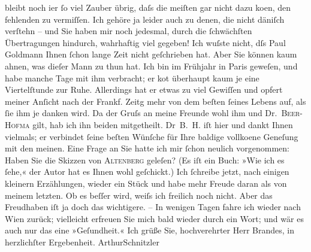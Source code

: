 \begin{ledgroupsized}[t]{13cm}
               bleibt noch i{\geminationm}er ſo viel Zauber übrig, daſs die meiſten
               gar nicht dazu ko{\geminationm}en, den fehlenden zu vermiſſen. Ich
               gehöre ja leider auch zu denen, die nicht däniſch verſtehn – und Sie haben mir noch jedesmal, durch die ſchwächſten
               Übertragungen hindurch, wahrhaftig {\pb}viel
               gegeben!\pend
           \pstart
           Ich wuſste nicht, dſs Paul Goldmann Ihnen
               ſchon lange Zeit nicht geſchrieben hat. Aber Sie können kaum ahnen, was dieſer Mann
               zu thun hat. Ich bin im Frühjahr in Paris
               geweſen, und habe manche Tage mit ihm verbracht; er ko{\geminationm}t
               überhaupt kaum je eine Viertelſtunde zur Ruhe. Allerdings hat er etwas zu viel
               Gewiſſen und opfert meiner An{\pb}ſicht nach der Frankf. Zeitg mehr von dem beſten ſeines Lebens
               auf, als ſie ihm je danken wird. Da der Gruſs an meine Freunde wohl ihm und Dr. \textsc{Beer-Hofma{\geminationn}} gilt, hab ich ihn beiden mitgetheilt. Dr \textsc{B. H.} iſt hier und dankt Ihnen vielmals; er verbindet ſeine beſten Wünſche für Ihre
               baldige vollko{\geminationm}ene Geneſung mit den meinen.\pend
           \pstart
           {\pb}Eine Frage an Sie hatte ich mir ſchon neulich
               vorgenommen: Haben Sie die Skizzen von \textsc{Altenberg} geleſen? (Es iſt ein Buch: »Wie ich es
                  ſehe,« der Autor hat es Ihnen wohl geſchickt.)\pend
           \pstart
           Ich ſchreibe jetzt, nach einigen kleinern Erzählungen, wieder ein Stück und habe mehr
               Freude daran als von meinem letzten. Ob es beſſer wird,  weiſs ich freilich {\pb}noch nicht. Aber
               das Freudhaben iſt ja doch das wichtigere. –\pend
           \pstart
           In wenigen Tagen fahre ich wieder nach Wien
               zurück; vielleicht erfreuen Sie mich bald wieder durch ein Wort; und wär es auch nur
               das eine »Geſundheit.«\pend
           \pstart Ich grüße Sie, hochverehrter Herr Brandes, in herzlichſter Ergebenheit.
                  \spacefill\mbox{ArthurSchnitzler}\pend{}
         
         \endnumbering{}\end{ledgroupsized}  \newcommand{\dateiname}{L00705}\newcommand{\titel}{Arthur Schnitzler an Georg Brandes, 18. 7. 1897}\newcommand{\editorInnen}{Martin Anton Müller und Gerd-Hermann Susen}
      